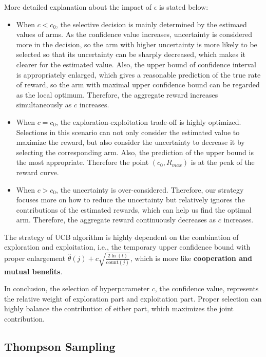 \documentclass[11pt]{article}
\begin{document}
More detailed explanation about the impact of \(\epsilon\) is stated
below:

\begin{itemize}
\item
  When \(c<c_0\), the selective decision is mainly determined by the
  estimaed values of arms. As the confidence value increases,
  uncertainty is considered more in the decision, so the arm with higher
  uncertainty is more likely to be selected so that its uncertainty can
  be sharply decreased, which makes it clearer for the estimated value.
  Also, the upper bound of confidence interval is appropriately
  enlarged, which gives a reasonable prediction of the true rate of
  reward, so the arm with maximal upper confidence bound can be regarded
  as the local optimum. Therefore, the aggregate reward increases
  simultaneously as \(c\) increases.
\item
  When \(c=c_0\), the exploration-exploitation trade-off is highly
  optimized. Selections in this scenario can not only consider the
  estimated value to maximize the reward, but also consider the
  uncertainty to decrease it by selecting the corresponding arm. Also,
  the prediction of the upper bound is the most appropriate. Therefore
  the point \((c_0,R_{max})\) is at the peak of the reward curve.
\item
  When \(c>c_0\), the uncertainty is over-considered. Therefore, our
  strategy focuses more on how to reduce the uncertainty but relatively
  ignores the contributions of the estimated rewards, which can help us
  find the optimal arm. Therefore, the aggregate reward continuously
  decreases as \(c\) increases.
\end{itemize}

The strategy of UCB algorithm is highly dependent on the combination of
exploration and exploitation, i.e., the temporary upper confidence bound
with proper enlargement
\(\hat{\theta}(j)+c\sqrt{\frac{2\ln(t)}{\text{count}(j)}}\), which is
more like \textbf{cooperation and mutual benefits}.

In conclusion, the selection of hyperparameter \(c\), the confidence
value, represents the relative weight of exploration part and
exploitation part. Proper selection can highly balance the contribution
of either part, which maximizes the joint contribution.

    \hypertarget{thompson-sampling}{%
\subsection{Thompson Sampling}\label{thompson-sampling}}
\end{document}
